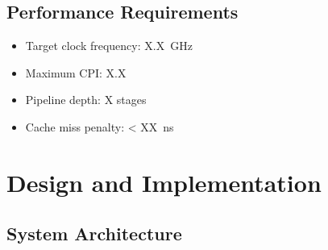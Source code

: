 \documentclass[12pt,letterpaper]{report}
\newcommand{\ghz}[1]{#1~GHz}
\newcommand{\ns}[1]{#1~ns}
\theoremstyle{definition}
\theoremstyle{plain}
\begin{document}
\section{Performance Requirements}

\begin{specbox}[title=Performance Targets]
\begin{itemize}
    \item Target clock frequency: \ghz{X.X}
    \item Maximum CPI: X.X
    \item Pipeline depth: X stages
    \item Cache miss penalty: < \ns{XX}
\end{itemize}
\end{specbox}

\chapter{Design and Implementation}

\section{System Architecture}



\end{document}

